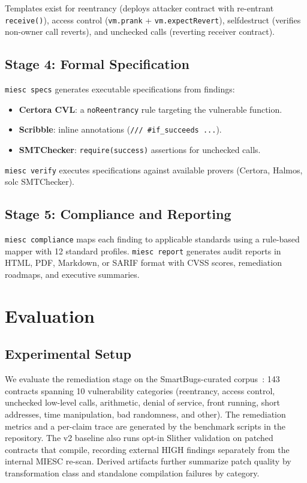 \documentclass[conference]{IEEEtran}
\begin{document}
Templates exist for reentrancy (deploys attacker contract with re-entrant \texttt{receive()}), access control (\texttt{vm.prank} + \texttt{vm.expectRevert}), selfdestruct (verifies non-owner call reverts), and unchecked calls (reverting receiver contract).

\subsection{Stage 4: Formal Specification}

\texttt{miesc specs} generates executable specifications from findings:
\begin{itemize}
    \item \textbf{Certora CVL}: a \texttt{noReentrancy} rule targeting the vulnerable function.
    \item \textbf{Scribble}: inline annotations (\texttt{/// \#if\_succeeds ...}).
    \item \textbf{SMTChecker}: \texttt{require(success)} assertions for unchecked calls.
\end{itemize}

\texttt{miesc verify} executes specifications against available provers (Certora, Halmos, solc SMTChecker).

\subsection{Stage 5: Compliance and Reporting}

\texttt{miesc compliance} maps each finding to applicable standards using a rule-based mapper with 12 standard profiles. \texttt{miesc report} generates audit reports in HTML, PDF, Markdown, or SARIF format with CVSS scores, remediation roadmaps, and executive summaries.

\section{Evaluation}

\subsection{Experimental Setup}

We evaluate the remediation stage on the SmartBugs-curated corpus~\cite{ferreira2020smartbugs}: 143 contracts spanning 10 vulnerability categories (reentrancy, access control, unchecked low-level calls, arithmetic, denial of service, front running, short addresses, time manipulation, bad randomness, and other). The remediation metrics and a per-claim trace are generated by the benchmark scripts in the repository. The v2 baseline also runs opt-in Slither validation on patched contracts that compile, recording external HIGH findings separately from the internal MIESC re-scan. Derived artifacts further summarize patch quality by transformation class and standalone compilation failures by category.
\end{document}
